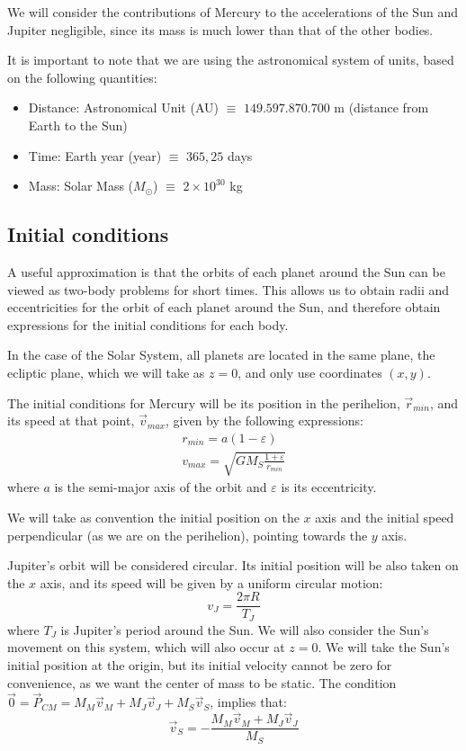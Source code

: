 \documentclass[journal]{IEEEtran}
\begin{document}
We will consider the contributions of Mercury to the accelerations of the Sun and Jupiter negligible, since its mass is much lower than that of the other bodies.

It is important to note that we are using the astronomical system of units, based on the following quantities:
\begin{itemize}
    \item Distance: Astronomical Unit (AU) $\equiv$ $149.597.870.700$ m (distance from Earth to the Sun)
    \item Time: Earth year (year) $\equiv$ $365,25$ days
    \item Mass: Solar Mass ($M_\odot$) $\equiv$ $2\times10^{30}$ kg 
\end{itemize}

\subsection{Initial conditions}

A useful approximation is that the orbits of each planet around the Sun can be viewed as two-body problems for short times. This allows us to obtain radii and eccentricities for the orbit of each planet around the Sun, and therefore obtain expressions for the initial conditions for each body.

In the case of the Solar System, all planets are located in the same plane, the ecliptic plane, which we will take as $z=0$, and only use coordinates $(x,y)$.

The initial conditions for Mercury will be its position in the perihelion, $\vec{r}_{min}$, and its speed at that point, $\vec{v}_{max}$, given by the following expressions:
\begin{gather}
    r_{min}=a(1-\varepsilon)\\
    v_{max}=\sqrt{GM_S\frac{1+\varepsilon}{r_{min}}}
\end{gather}
where $a$ is the semi-major axis of the orbit and $\varepsilon$ is its eccentricity.

We will take as convention the initial position on the $x$ axis and the initial speed perpendicular (as we are on the perihelion), pointing towards the $y$ axis.

Jupiter's orbit will be considered circular. Its initial position will be also taken on the $x$ axis, and its speed will be given by a uniform circular motion:
\begin{equation}
    v_J=\frac{2\pi R}{T_J}
\end{equation}
where $T_J$ is Jupiter's period around the Sun. We will also consider the Sun's movement on this system, which will also occur at $z=0$. We will take the Sun's initial position at the origin, but its initial velocity cannot be zero for convenience, as we want the center of mass to be static. The condition $\vec{0}=\vec{P}_{CM}=M_M\vec{v}_M+M_J\vec{v}_J+M_S\vec{v}_S$, implies that:
\begin{equation}
    \vec{v}_S=-\frac{M_M\vec{v}_M+M_J\vec{v}_J}{M_S}
\end{equation}
\end{document}
